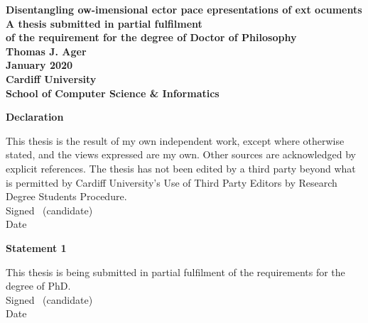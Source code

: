 \documentclass[a4paper,oneside,onecolumn,openright,12pt]{book}
\begin{document}
\frontmatter


\begin{titlepage}

\begin{center}
\vspace*{3ex}
\textbf{\Huge Disentangling ow-imensional ector pace epresentations of ext ocuments}\\[2ex]
\textbf{\large A thesis submitted in partial fulfilment}\\[1ex]
\textbf{\large of the requirement for the degree of Doctor of
  Philosophy}\\[16ex]
\textbf{\LARGE Thomas J. Ager}\\
\vfill
\textbf{\LARGE January 2020}\\
\vfill
\textbf{\LARGE Cardiff University}\\[1ex]
\textbf{\LARGE School of Computer Science \& Informatics}\\[4ex]
\end{center}

\end{titlepage}
\newpage\thispagestyle{empty}\cleardoublepage


\thispagestyle{plain}

\textbf{\large Declaration}

This thesis is the result of my own independent work, except where otherwise stated,
and the views expressed are my own. Other sources are acknowledged by explicit references.
The thesis has not been edited by a third party beyond what is permitted by
Cardiff University's Use of Third Party Editors by Research Degree Students Procedure.\\[2ex]
Signed \dotfill \ (candidate) \hspace*{10em}\\[1ex]
Date\ \ \ \ \ \dotfill \hspace*{18em}

\vfill

\vfill

\textbf{\large Statement 1}

This thesis is being submitted in partial fulfilment of the requirements for the degree of PhD.\\[2ex]
Signed \dotfill \ (candidate) \hspace*{10em}\\[1ex]
Date\ \ \ \ \ \dotfill \hspace*{18em}
\end{document}
